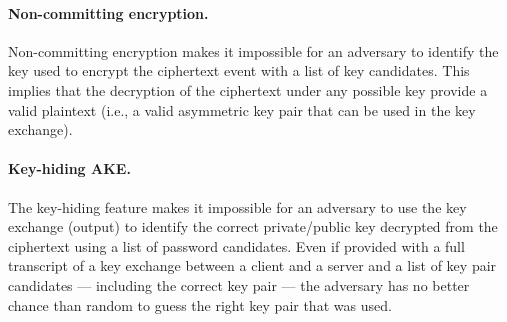 ﻿\documentclass[../report.tex]{subfiles}
\begin{document}
\paragraph{Non-committing encryption.} \label{sec:non_committing_encryption}
Non-committing encryption makes it impossible for an adversary to identify the key used to encrypt the ciphertext event with a list of key candidates. This implies that the decryption of the ciphertext under any possible key provide a valid plaintext (i.e., a valid asymmetric key pair that can be used in the key exchange).
\paragraph{Key-hiding AKE.} \label{sec:key_hiding_ake}
The key-hiding feature makes it impossible for an adversary to use the key exchange (output) to identify the correct private/public key decrypted from the ciphertext using a list of password candidates.
Even if provided with a full transcript of a key exchange between a client and a server and a list of key pair candidates --- including the correct key pair --- the adversary has no better chance than random to guess the right key pair that was used.



% 
% 


\end{document}
